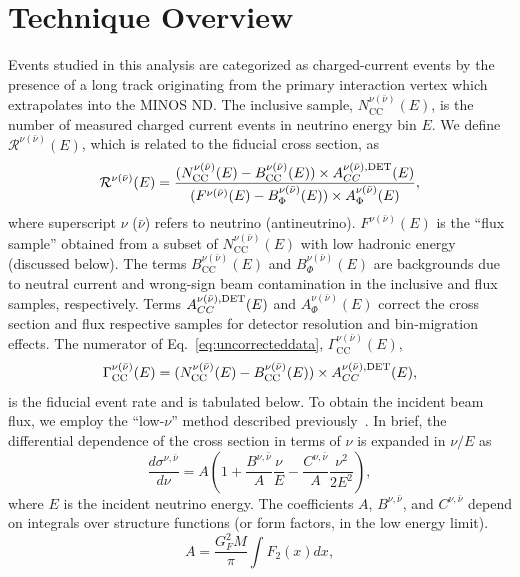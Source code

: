 \documentclass[aps,preprint,showpacs,superscriptaddress,linenumbers,nofootinbib,prd,12pt]{revtex4}
\newcommand{\ncc}{\ensuremath{N_\mathrm{CC}^{\nu(\bar{\nu})}(E)}}
\newcommand{\gcc}{\ensuremath{\Gamma_\mathrm{CC}^{\nu(\bar{\nu})}(E)}}
\newcommand{\bcc}{\ensuremath{B_\mathrm{CC}^{\nu(\bar{\nu})}(E)}}
\newcommand{\fsam}{\ensuremath{F^{\nu(\bar{\nu})}(E)}}
\newcommand{\aflux}{\ensuremath{A_{\Phi}^{\nu(\bar{\nu})}(E)}}
\newcommand{\bflux}{\ensuremath{B_{\Phi}^{\nu(\bar{\nu})}(E)}}
\begin{document}
\section{Technique Overview}

Events studied in this analysis are categorized as charged-current events 
by the presence of a long track originating from the  primary interaction vertex
which extrapolates into the MINOS ND.
The inclusive sample, \ncc{}, is the number of measured charged current events in neutrino energy bin $E$.
We define $\mathcal{R}^{\nu(\bar{\nu})}(E)$, which is related to the fiducial cross section, as
\begin{equation}
\mathcal{R}^{\nu(\bar{\nu})}(E)=\frac{(\ncc{}-\bcc{})\times A^{{\nu(\bar{\nu})},{\rm DET}}_{CC}(E)}
{(\fsam{}-\bflux{})\times\aflux{}},
\label{eq:uncorrecteddata}
\end{equation}
\noindent
where superscript $\nu$ ($\bar{\nu}$) refers to neutrino (antineutrino).  \fsam{} is the ``flux sample'' obtained from a 
subset of \ncc{} with low hadronic energy (discussed below). The terms $\bcc{}$ and $\bflux{}$ are
backgrounds due to neutral current and wrong-sign beam contamination in the inclusive and flux 
samples, respectively. Terms $A^{{\nu(\bar{\nu})},{\rm DET}}_{CC}(E)$ and $\aflux{}$ correct the cross 
section and flux respective samples for detector resolution and bin-migration effects. 
The numerator of Eq.~\eqref{eq:uncorrecteddata}, $\gcc$, 
\begin{equation}
\gcc=(\ncc{}-\bcc{})\times A^{{\nu(\bar{\nu})},{\rm DET}}_{CC}(E),
\label{eq:uncorrecteddata_inclusive}
\end{equation}
is the fiducial event rate and is tabulated below.
To obtain the incident beam flux, 
we employ the ``low-$\nu$'' method described previously~\citep{Mishra:1990ax,DeVan:2016rkm,seligman,minos}.
In brief, the differential dependence of the cross section in terms of $\nu$ is expanded in $\nu/E$ as
\begin{equation}
\frac{d\sigma^{\nu, \bar{\nu}}}{d\nu}=A\left(1 + \frac{B^{\nu, \bar{\nu}}}{A}\frac{\nu}{E}-\frac{C^{\nu, \bar{\nu}}}{A}\frac{\nu^{2}}{2E^{2}}\right),
\label{eq:dsigmadnu}
\end{equation}
where $E$ is the incident neutrino energy. The coefficients $A$, $B^{\nu, \bar{\nu}}$, and $C^{\nu, \bar{\nu}}$ depend on integrals over structure functions
(or form factors, in the low energy limit). 
\begin{equation}
A=\frac{G^{2}_{F}M}{\pi}\int F_{2}(x)dx,
\label{eq:aterm}
\end{equation}
\end{document}
